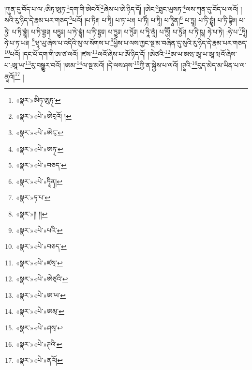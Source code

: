 །ཀུན་དུ་བོད་པ་ལ་:ཨིཏ་ཨུཏ་\footnote{«སྣར་»ཨིཏ྄་ཨུཏ྄་}དག་གི་ཨེངའོ་\footnote{«སྣར་»«པེ་»ཨེང྄འོ། །}ཞེས་པ་ཨེ་ཉིད་དོ། །ཨེང་\footnote{«སྣར་»«པེ་»ཨེང྄་}ཐུང་ཡུསཏ་\footnote{«སྣར་»«པེ་»ཨཏ྄་}ལས་ཀུན་དུ་བོད་པ་ལའོ། །སའི་རུ་ཉིད་དེ་རྣམ་པར་གཅད་\footnote{«སྣར་»«པེ་»བཅད་}པའོ། །པ་ཏིཿ། པ་ཏཱི། པ་ཏ་ཡཿ། པ་ཏིཾ། པ་ཏཱི། པ་ཏཱིན།\footnote{«སྣར་»«པེ་»ཏཱིན྄།} པ་ཏྱཱ། པ་ཏི་བྷྱཱཾ། པ་ཏི་བྷིཿ། པ་ཏྱེ། པ་ཏི་བྷྱཱཾ། པ་ཏི་བྷྱཿ། པཏྱུཿ། པ་ཏེ་བྷྱཱཾ། པ་ཏི་བྷྱཿ། པ་ཏྱུཿ། པ་ཏྱོཿ། པ་ཏཱི་ནཱཾ། པ་ཏྱཽ། པ་ཏྱོཿ། པ་ཏི་ཥུ། ཧེ་པ་ཏེ། :ཧེ་པ་\footnote{«སྣར་»ཧ་པ་}ཏཱི། ཧེ་པ་ཏ་ཡཿ། \footnote{«སྣར་»།། །། }ཝཱ་ཡུ་ཞེས་པ་འདིའི་སུ་ལ་སོགས་པ་\footnote{«སྣར་»«པེ་»པའི་}ཕྱིས་པ་ལས་ཀྱང་སྔ་མ་བཞིན་དུ་སུའི་རུ་ཉིད་དེ་རྣམ་པར་གཅད་\footnote{«སྣར་»«པེ་»བཅད་}པའོ། །དང་པོ་དག་གི་ཨ་ཙ་ལའོ། །ཛས་\footnote{«སྣར་»«པེ་»ཛས྄་}ལའོ་ཞེས་པ་ཨོ་ཉིད་དོ། །ཨེཙའི་\footnote{«སྣར་»«པེ་»ཨེཙ྄འི་}ཨ་ཡ་ཨཝ་ཨཱ་ཡ་ཨཱ་ཝའོ་ཞེས་པ་:ཨཱ་ཡ་\footnote{«སྣར་»«པེ་»ཨ་ཡ་}རུ་བསྒྱུར་བའོ། །ཨམ་\footnote{«སྣར་»«པེ་»ཨམ྄་}ལ་སྔ་མའོ། །དེ་ལས་ཤས་\footnote{«སྣར་»«པེ་»ཤས྄་}ཀྱི་ན་སྐྱེས་པ་ལའོ། །ཊཱའི་\footnote{«སྣར་»«པེ་»ཊའི་}བུད་མེད་མ་ཡིན་པ་ལ་ནཱའོ།\footnote{«སྣར་»«པེ་»ནའོ།} །
